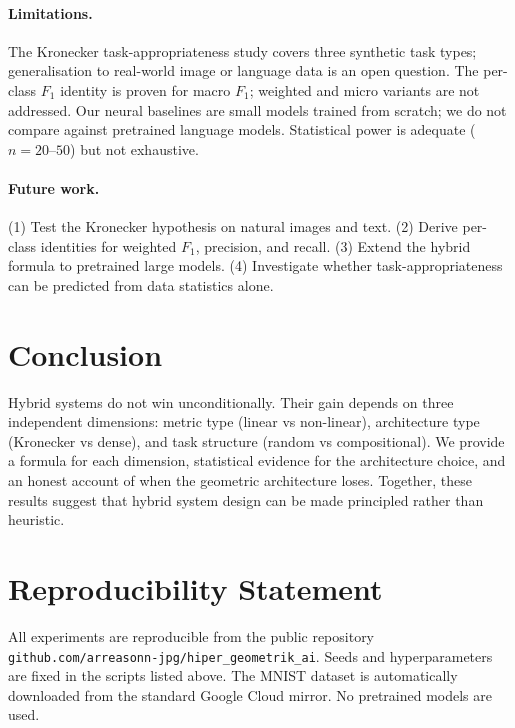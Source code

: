 \documentclass[11pt,a4paper]{article}
\begin{document}
\paragraph{Limitations.}
The Kronecker task-appropriateness study covers three synthetic task
types; generalisation to real-world image or language data is an
open question. The per-class $F_1$ identity is proven for macro $F_1$;
weighted and micro variants are not addressed. Our neural baselines
are small models trained from scratch; we do not compare against
pretrained language models. Statistical power is adequate
($n = 20$--$50$) but not exhaustive.

\paragraph{Future work.}
(1) Test the Kronecker hypothesis on natural images and text.
(2) Derive per-class identities for weighted $F_1$, precision, and recall.
(3) Extend the hybrid formula to pretrained large models.
(4) Investigate whether task-appropriateness can be predicted from
data statistics alone.

\section{Conclusion}
\label{sec:conclusion}

Hybrid systems do not win unconditionally. Their gain depends on three
independent dimensions: metric type (linear vs non-linear), architecture
type (Kronecker vs dense), and task structure (random vs compositional).
We provide a formula for each dimension, statistical evidence for the
architecture choice, and an honest account of when the geometric
architecture loses. Together, these results suggest that hybrid system
design can be made principled rather than heuristic.

\section*{Reproducibility Statement}
All experiments are reproducible from the public repository
\texttt{github.com/arreasonn-jpg/hiper\_geometrik\_ai}. Seeds and
hyperparameters are fixed in the scripts listed above. The MNIST
dataset is automatically downloaded from the standard Google Cloud
mirror. No pretrained models are used.
\end{document}
